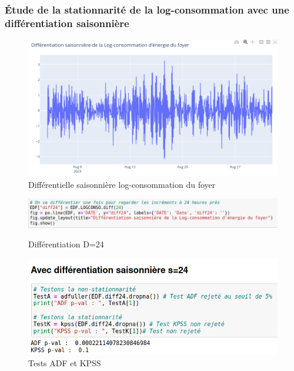 \documentclass{beamer}
\theoremstyle{definition}
\begin{document}
\begin{frame}
	\frametitle{Étude de la stationnarité de la log-consommation avec une différentiation saisonnière}
	\begin{minipage}[t]{1\linewidth}
		\begin{minipage}[c]{0.55\linewidth}\centering\begin{figure}
				\centering
				\includegraphics[width=1\linewidth]{8.png}
				\caption*{Différentielle saisonnière log-consommation du foyer}
		\end{figure}\end{minipage}\hfill 
		\begin{minipage}[c]{0.44\linewidth}\centering\begin{figure}
				\begin{center}
					\includegraphics[width=1\linewidth]{7.png}
					\caption*{Différentiation D=24}
					\includegraphics[width=1\linewidth]{9.png}			
					\caption*{Tests ADF et KPSS}
				\end{center}
				
		\end{figure}\end{minipage}
	\end{minipage}
	
\end{frame}
\end{document}
